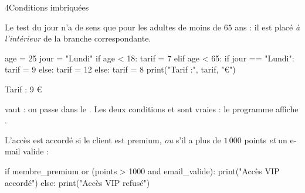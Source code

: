 \begin{corrige}{4}{Conditions imbriquées}
\begin{questions}
  \item Le test du jour n'a de sens que pour les adultes de moins de $65$ ans : il est placé \emph{à l'intérieur} de la branche
    correspondante.
\begin{codecote}
\begin{pythoncol}
age = 25
jour = "Lundi"
if age < 18:
    tarif = 7
elif age < 65:
    if jour == "Lundi":
        tarif = 9
    else:
        tarif = 12
else:
    tarif = 8
print("Tarif :", tarif, "€")
\end{pythoncol}
\cote
\begin{consolecol}
Tarif : 9 €
\end{consolecol}
\end{codecote}
  \item {} vaut  : on passe dans le . Les deux conditions  et
     sont vraies : le programme affiche .
  \item L'accès est accordé si le client est premium, \emph{ou} s'il a plus de $1\,000$ points \emph{et} un e-mail valide :
\begin{python}
if membre_premium or (points > 1000 and email_valide):
    print("Accès VIP accordé")
else:
    print("Accès VIP refusé")
\end{python}
\end{questions}
\end{corrige}

